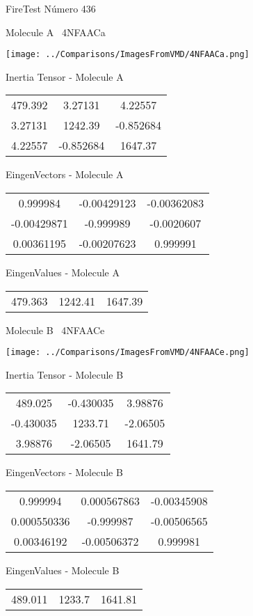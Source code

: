 \vtab[-3cm]
\begin{center}
{\large FireTest \tab Número 436}
\end{center}
\begin{multicols}{2}
\begin{center}

Molecule A \
4NFAACa

\texttt{[image: ../Comparisons/ImagesFromVMD/4NFAACa.png]}

Inertia Tensor - Molecule A \\
\begin{tabular}{|c c c|}
479.392	 & 	3.27131	 & 	4.22557	 \\
3.27131	 & 	1242.39	 & 	-0.852684	 \\
4.22557	 & 	-0.852684	 & 	1647.37
\end{tabular}

\vtab
 EingenVectors - Molecule A     \\
\begin{tabular}{|c c c|}
0.999984	 & 	-0.00429123	 & 	-0.00362083	 \\
-0.00429871	 & 	-0.999989	 & 	-0.0020607	 \\
0.00361195	 & 	-0.00207623	 & 	0.999991
\end{tabular}

\vtab
 EingenValues - Molecule A     \\
\begin{tabular}{|c c c|}
479.363	 & 	1242.41	 & 	1647.39	 \\
\end{tabular}
\columnbreak

Molecule B \
4NFAACe

\texttt{[image: ../Comparisons/ImagesFromVMD/4NFAACe.png]}

Inertia Tensor - Molecule B \\
\begin{tabular}{|c c c|}
489.025	 & 	-0.430035	 & 	3.98876	 \\
-0.430035	 & 	1233.71	 & 	-2.06505	 \\
3.98876	 & 	-2.06505	 & 	1641.79
\end{tabular}

\vtab
 EingenVectors - Molecule B     \\
\begin{tabular}{|c c c|}
0.999994	 & 	0.000567863	 & 	-0.00345908	 \\
0.000550336	 & 	-0.999987	 & 	-0.00506565	 \\
0.00346192	 & 	-0.00506372	 & 	0.999981
\end{tabular}

\vtab
 EingenValues - Molecule B     \\
\begin{tabular}{|c c c|}
489.011	 & 	1233.7	 & 	1641.81	 \\
\end{tabular}

\end{center}
\end{multicols}

